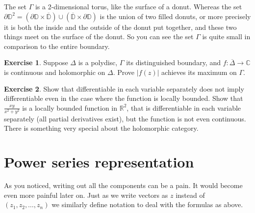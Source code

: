 \documentclass[12pt,openany]{book}
\newcommand{\sabs}[1]{\lvert {#1} \rvert}
\newcommand{\C}{{\mathbb{C}}}
\newcommand{\R}{{\mathbb{R}}}
\newcommand{\D}{{\mathbb{D}}}
\theoremstyle{plain}
\theoremstyle{remark}
\theoremstyle{definition}
\newenvironment{exbox}{%
    \def\FrameCommand{\vrule width 1pt \relax\hspace {10pt}}%
    \MakeFramed {\advance \hsize -\width \FrameRestore }%
}{%
    \endMakeFramed
}
\theoremstyle{exercise}
\newtheorem{exercise}{Exercise}[section]
\theoremstyle{example}
\begin{document}

\begin{center}

\end{center}


The set $\Gamma$ is a 2-dimensional torus, like the surface of a
donut.  Whereas the set $\partial \D^2 =
(\partial \D \times \overline{\D}) \cup
(\overline{\D} \times \partial \D)$ is the union of two filled donuts, or more
precisely it is both the inside and the outside of the donut put together,
and these two things meet on the surface of the donut.  So you can see the
set $\Gamma$ is quite small in comparison to the entire boundary.

\begin{exbox}
\begin{exercise}
Suppose $\Delta$ is a polydisc, $\Gamma$ its distinguished boundary,
and $f \colon \overline{\Delta} \to \C$ is continuous and 
holomorphic on $\Delta$.
Prove
$\sabs{f(z)}$ achieves its maximum on $\Gamma$.
\end{exercise}

\begin{exercise}
Show that differentiable
in each variable separately does not imply differentiable even in
the case where the function is locally bounded.
Show that $\frac{xy}{x^2+y^2}$ is a
locally bounded function in $\R^2$, that is differentiable
in each variable separately (all partial derivatives exist), but 
the function is not even continuous.  There is something very
special about the holomorphic category.
\end{exercise}
\end{exbox}


\section{Power series representation}

As you noticed, writing out all the components can be a pain.  It would become
even more painful later on.  Just as we write 
vectors as $z$ instead of $(z_1,z_2,\ldots,z_n)$ we similarly
define notation to deal with the formulas as above.
\end{document}

